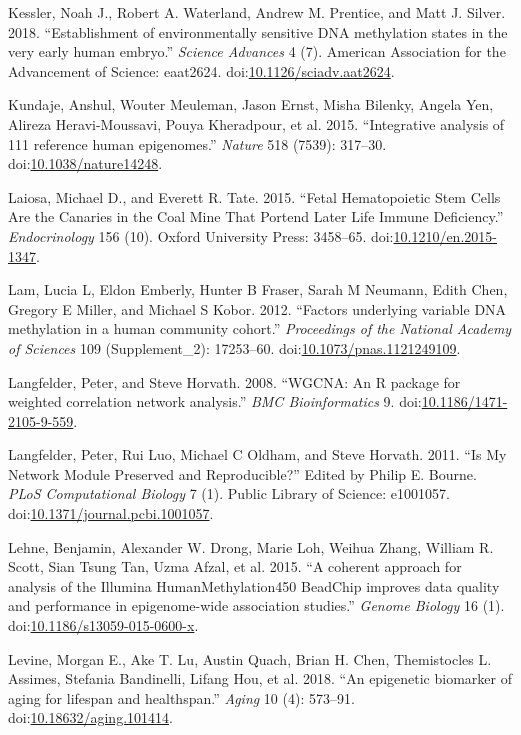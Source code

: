 \documentclass[]{article}
\theoremstyle{definition}
\theoremstyle{definition}
\theoremstyle{definition}
\theoremstyle{remark}
\begin{document}
Kessler, Noah J., Robert A. Waterland, Andrew M. Prentice, and Matt J.
Silver. 2018. ``Establishment of environmentally sensitive DNA
methylation states in the very early human embryo.'' \emph{Science
Advances} 4 (7). American Association for the Advancement of Science:
eaat2624.
doi:\href{http://dx.doi.org/10.1126/sciadv.aat2624}{10.1126/sciadv.aat2624}.

Kundaje, Anshul, Wouter Meuleman, Jason Ernst, Misha Bilenky, Angela
Yen, Alireza Heravi-Moussavi, Pouya Kheradpour, et al. 2015.
``Integrative analysis of 111 reference human epigenomes.''
\emph{Nature} 518 (7539): 317--30.
doi:\href{http://dx.doi.org/10.1038/nature14248}{10.1038/nature14248}.

Laiosa, Michael D., and Everett R. Tate. 2015. ``Fetal Hematopoietic
Stem Cells Are the Canaries in the Coal Mine That Portend Later Life
Immune Deficiency.'' \emph{Endocrinology} 156 (10). Oxford University
Press: 3458--65.
doi:\href{http://dx.doi.org/10.1210/en.2015-1347}{10.1210/en.2015-1347}.

Lam, Lucia L, Eldon Emberly, Hunter B Fraser, Sarah M Neumann, Edith
Chen, Gregory E Miller, and Michael S Kobor. 2012. ``Factors underlying
variable DNA methylation in a human community cohort.''
\emph{Proceedings of the National Academy of Sciences} 109
(Supplement\_2): 17253--60.
doi:\href{http://dx.doi.org/10.1073/pnas.1121249109}{10.1073/pnas.1121249109}.

Langfelder, Peter, and Steve Horvath. 2008. ``WGCNA: An R package for
weighted correlation network analysis.'' \emph{BMC Bioinformatics} 9.
doi:\href{http://dx.doi.org/10.1186/1471-2105-9-559}{10.1186/1471-2105-9-559}.

Langfelder, Peter, Rui Luo, Michael C Oldham, and Steve Horvath. 2011.
``Is My Network Module Preserved and Reproducible?'' Edited by Philip E.
Bourne. \emph{PLoS Computational Biology} 7 (1). Public Library of
Science: e1001057.
doi:\href{http://dx.doi.org/10.1371/journal.pcbi.1001057}{10.1371/journal.pcbi.1001057}.

Lehne, Benjamin, Alexander W. Drong, Marie Loh, Weihua Zhang, William R.
Scott, Sian Tsung Tan, Uzma Afzal, et al. 2015. ``A coherent approach
for analysis of the Illumina HumanMethylation450 BeadChip improves data
quality and performance in epigenome-wide association studies.''
\emph{Genome Biology} 16 (1).
doi:\href{http://dx.doi.org/10.1186/s13059-015-0600-x}{10.1186/s13059-015-0600-x}.

Levine, Morgan E., Ake T. Lu, Austin Quach, Brian H. Chen, Themistocles
L. Assimes, Stefania Bandinelli, Lifang Hou, et al. 2018. ``An
epigenetic biomarker of aging for lifespan and healthspan.''
\emph{Aging} 10 (4): 573--91.
doi:\href{http://dx.doi.org/10.18632/aging.101414}{10.18632/aging.101414}.
\end{document}
